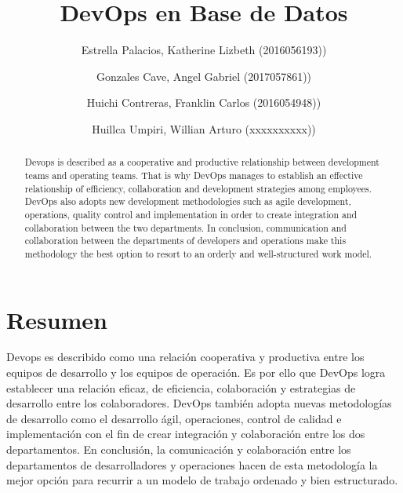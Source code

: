 \documentclass[preprint,12pt]{elsarticle}
\begin{document}
	
	\begin{frontmatter} 

		\title{\huge DevOps en Base de Datos}
		
		\author{Estrella Palacios, Katherine Lizbeth              	(2016056193))}
		\author{Gonzales Cave, Angel Gabriel              	(2017057861))}
		\author{Huichi Contreras, Franklin Carlos         	(2016054948))} 
		\author{Huillca Umpiri, Willian Arturo             		(xxxxxxxxxx))} %
		\address{Escuela Profesional de Ingeniería de Sistemas}
		\address{Universidad Privada de Tacna}
		\address{Tacna, Perú}
		

		\begin{abstract}
		
Devops is described as a cooperative and productive relationship between development teams and operating teams. That is why DevOps manages to establish an effective relationship of efficiency, collaboration and development strategies among employees.
DevOps also adopts new development methodologies such as agile development, operations, quality control and implementation in order to create integration and collaboration between the two departments.
In conclusion, communication and collaboration between the departments of developers and operations make this methodology the best option to resort to an orderly and well-structured work model.

		\end{abstract}


	\end{frontmatter}


\section{Resumen}

Devops es describido como una relación cooperativa y productiva entre los equipos de desarrollo y los equipos de operación. Es por ello que DevOps logra establecer una relación eficaz, de eficiencia, colaboración y estrategias de desarrollo entre los colaboradores.
DevOps también adopta nuevas metodologías de desarrollo como el desarrollo ágil, operaciones, control de calidad e implementación con el fin de crear integración y colaboración entre los dos departamentos.
En conclusión, la comunicación y colaboración entre los departamentos de desarrolladores y operaciones hacen de esta metodología la mejor opción para recurrir a un modelo de trabajo ordenado y bien estructurado.
\end{document}

